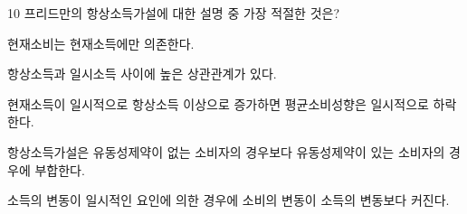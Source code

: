 \begin{question}{10}
프리드만의 항상소득가설에 대한 설명 중 가장 적절한 것은?
\begin{choices}
  \item 현재소비는 현재소득에만 의존한다.
  \item 항상소득과 일시소득 사이에 높은 상관관계가 있다.
  \item 현재소득이 일시적으로 항상소득 이상으로 증가하면 평균소비성향은 일시적으로 하락한다.
  \item 항상소득가설은 유동성제약이 없는 소비자의 경우보다 유동성제약이 있는 소비자의 경우에 부합한다.
  \item 소득의 변동이 일시적인 요인에 의한 경우에 소비의 변동이 소득의 변동보다 커진다.
\end{choices}
\end{question}
